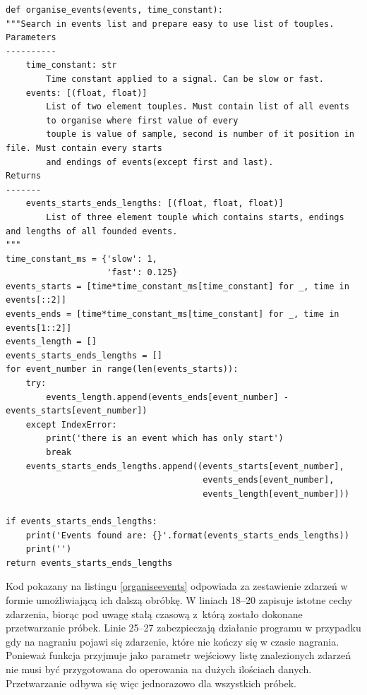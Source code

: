 \documentclass[eng,printmode]{mgr}
\begin{document}
\begin{minipage}{\linewidth}
\begin{lstlisting}[caption={fragment kodu źródłowego pliku Detectors.py, klasa EventsOrganiser,\newline metoda organise\_events},captionpos=b,label={organiseevents}]  
    def organise_events(events, time_constant):
"""Search in events list and prepare easy to use list of touples.
Parameters
----------
    time_constant: str
        Time constant applied to a signal. Can be slow or fast.
    events: [(float, float)]
        List of two element touples. Must contain list of all events
        to organise where first value of every
        touple is value of sample, second is number of it position in file. Must contain every starts
        and endings of events(except first and last).
Returns
-------
    events_starts_ends_lengths: [(float, float, float)]
        List of three element touple which contains starts, endings and lengths of all founded events.
"""
time_constant_ms = {'slow': 1,
                    'fast': 0.125}
events_starts = [time*time_constant_ms[time_constant] for _, time in events[::2]]
events_ends = [time*time_constant_ms[time_constant] for _, time in events[1::2]]
events_length = []
events_starts_ends_lengths = []
for event_number in range(len(events_starts)):
    try:
        events_length.append(events_ends[event_number] - events_starts[event_number])
    except IndexError:
        print('there is an event which has only start')
        break
    events_starts_ends_lengths.append((events_starts[event_number],
                                       events_ends[event_number],
                                       events_length[event_number]))

if events_starts_ends_lengths:
    print('Events found are: {}'.format(events_starts_ends_lengths))
    print('')
return events_starts_ends_lengths
\end{lstlisting}
\end{minipage}

Kod pokazany na listingu \ref{organiseevents} odpowiada za zestawienie zdarzeń w formie umożliwiającą ich dalszą obróbkę. W liniach 18--20 zapisuje istotne cechy zdarzenia, biorąc pod uwagę stałą czasową  z~którą zostało dokonane przetwarzanie próbek. Linie 25--27 zabezpieczają działanie programu w przypadku gdy na nagraniu pojawi się zdarzenie, które nie kończy się w czasie nagrania. Ponieważ funkcja przyjmuje jako parametr wejściowy listę znalezionych zdarzeń nie musi być przygotowana do operowania na dużych ilościach danych. Przetwarzanie odbywa się więc jednorazowo dla wszystkich próbek. 
\end{document}

